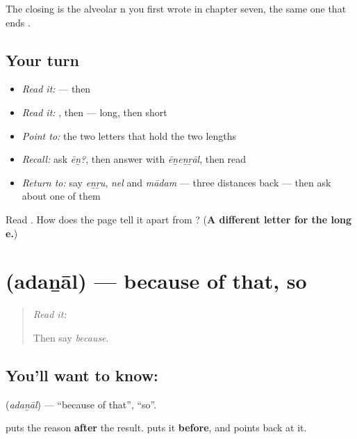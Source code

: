 The closing \textbf{} is the alveolar n you first wrote in chapter seven, the same one that ends \textbf{}.

\subsection*{Your turn}
\begin{itemize}
\raggedright
  \item \emph{Read it:} \textbf{} — then \textbf{}
  \item \emph{Read it:} \textbf{}, then \textbf{} — long, then short
  \item \emph{Point to:} the two letters that hold the two lengths
  \item \emph{Recall:} ask \emph{ēṉ?}, then answer with \emph{ēṉeṉṟāl}, then read \textbf{}
  \item \emph{Return to:} say \emph{eṉṟu}, \emph{nel} and \emph{mādam} — three distances back — then ask  about one of them
\end{itemize}

\begin{tcolorbox}[breakable,colback=teal!4,colframe=teal!35!black,title={Before you move on}]
Read \textbf{}. How does the page tell it apart from \textbf{}? (\textbf{A different letter for the long e.})
\end{tcolorbox}
\section[\texorpdfstring{\ta{அதனால்} (adaṉāl)}{அதனால் (adaṉāl)}]{ (adaṉāl) — because of that, so}

\label{lesson:TA-C78-therefore}



\begin{quote}
\emph{Read it:} \textbf{}

Then say \emph{because}.
\end{quote}

\subsection*{You'll want to know: }
\textbf{} (\emph{adaṉāl}) — \textquotedblleft{}because of that\textquotedblright{}, \textquotedblleft{}so\textquotedblright{}.

 puts the reason \textbf{after} the result.  puts it \textbf{before}, and points back at it.

